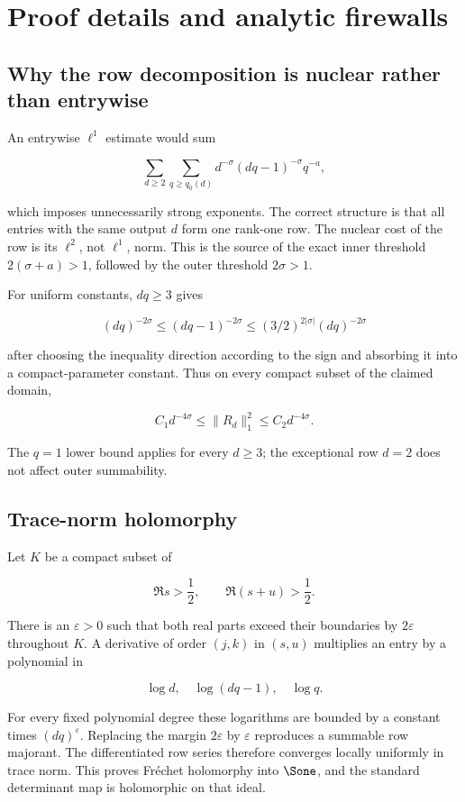 \section{Proof details and analytic firewalls}
\label{app:proofs}

\subsection{Why the row decomposition is nuclear rather than entrywise}

An entrywise \(\ell^1\) estimate would sum

\[
 \sum_{d\ge2}\sum_{q\ge q_0(d)}
 d^{-\sigma}(dq-1)^{-\sigma}q^{-a},
\]

which imposes unnecessarily strong exponents.  The correct structure is that
all entries with the same output \(d\) form one rank-one row.  The nuclear
cost of the row is its \(\ell^2\), not \(\ell^1\), norm.  This is the source
of the exact inner threshold \(2(\sigma+a)>1\), followed by the outer
threshold \(2\sigma>1\).

For uniform constants, \(dq\ge3\) gives

\[
 (dq)^{-2\sigma}
 \le (dq-1)^{-2\sigma}
 \le (3/2)^{2|\sigma|}(dq)^{-2\sigma}
\]

after choosing the inequality direction according to the sign and absorbing
it into a compact-parameter constant.  Thus on every compact subset of the
claimed domain,

\[
 C_1d^{-4\sigma}
 \le\|R_d\|_1^2
 \le C_2d^{-4\sigma}.
\]

The \(q=1\) lower bound applies for every \(d\ge3\); the exceptional row
\(d=2\) does not affect outer summability.

\subsection{Trace-norm holomorphy}

Let \(K\) be a compact subset of

\[
 \Re s>\frac12,
 \qquad
 \Re(s+u)>\frac12.
\]

There is an \(\varepsilon>0\) such that both real parts exceed their
boundaries by \(2\varepsilon\) throughout \(K\).  A derivative of order
\((j,k)\) in \((s,u)\) multiplies an entry by a polynomial in

\[
 \log d,\quad\log(dq-1),\quad\log q.
\]

For every fixed polynomial degree these logarithms are bounded by a constant
times \((dq)^\varepsilon\).  Replacing the margin \(2\varepsilon\) by
\(\varepsilon\) reproduces a summable row majorant.  The differentiated row
series therefore converges locally uniformly in trace norm.  This proves
Fréchet holomorphy into \(\Sone\), and the standard determinant map is
holomorphic on that ideal.

